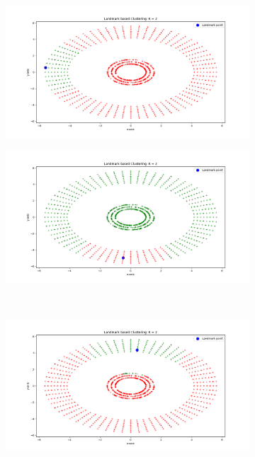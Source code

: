\documentclass[a4paper,11pt]{article}
\begin{document}
\begin{mlsolution}
\begin{figure}[!htbp]
\begin{subfigure}{0.5\textwidth}
		\caption{}
		\label{l2}
	\end{subfigure}
\\
	\begin{subfigure}{0.5\textwidth}
		\centering
		\includegraphics[width=1.1\textwidth]{images/l_random3.png}
		\caption{}
		\label{l3}
	\end{subfigure}
	\begin{subfigure}{0.5\textwidth}
		\centering
		\includegraphics[width=1.1\textwidth]{images/l_random4.png}
		\caption{}
		\label{l4}
	\end{subfigure}
\\
	\begin{subfigure}{0.5\textwidth}
		\centering
		\includegraphics[width=1.1\textwidth]{images/l_random5.png}

\end{subfigure}
\end{figure}
\end{mlsolution}
\end{document}
